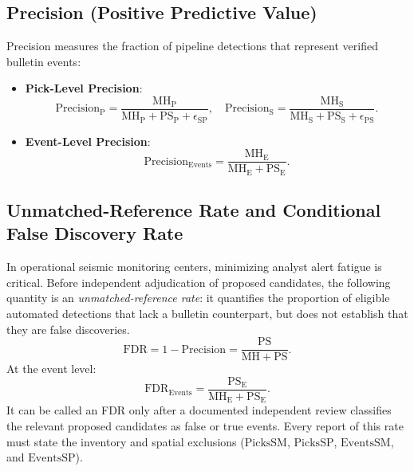 \subsection{Precision (Positive Predictive Value)}
Precision measures the fraction of pipeline detections that represent verified bulletin events:
\begin{itemize}
  \item \textbf{Pick-Level Precision}:
  \begin{equation}
    \mathrm{Precision}_{\mathrm{P}} = \frac{\mathrm{MH}_{\mathrm{P}}}{\mathrm{MH}_{\mathrm{P}} + \mathrm{PS}_{\mathrm{P}} + \epsilon_{\mathrm{SP}}}, \quad \mathrm{Precision}_{\mathrm{S}} = \frac{\mathrm{MH}_{\mathrm{S}}}{\mathrm{MH}_{\mathrm{S}} + \mathrm{PS}_{\mathrm{S}} + \epsilon_{\mathrm{PS}}}.
  \end{equation}
  \item \textbf{Event-Level Precision}:
  \begin{equation}
    \mathrm{Precision}_{\mathrm{Events}} = \frac{\mathrm{MH}_{\mathrm{E}}}{\mathrm{MH}_{\mathrm{E}} + \mathrm{PS}_{\mathrm{E}}}.
  \end{equation}
\end{itemize}

\subsection{Unmatched-Reference Rate and Conditional False Discovery Rate}
In operational seismic monitoring centers, minimizing analyst alert fatigue is critical. Before independent adjudication of proposed candidates, the following quantity is an \emph{unmatched-reference rate}: it quantifies the proportion of eligible automated detections that lack a bulletin counterpart, but does not establish that they are false discoveries.
\begin{equation}
  \mathrm{FDR} = 1 - \mathrm{Precision} = \frac{\mathrm{PS}}{\mathrm{MH} + \mathrm{PS}}.
\end{equation}
At the event level:
\begin{equation}
  \mathrm{FDR}_{\mathrm{Events}} = \frac{\mathrm{PS}_{\mathrm{E}}}{\mathrm{MH}_{\mathrm{E}} + \mathrm{PS}_{\mathrm{E}}}.
\end{equation}
  It can be called an FDR only after a documented independent review classifies the relevant proposed candidates as false or true events. Every report of this rate must state the inventory and spatial exclusions ($\mathrm{PicksSM}$, $\mathrm{PicksSP}$, $\mathrm{EventsSM}$, and $\mathrm{EventsSP}$).

